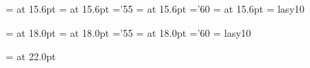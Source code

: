  \font\svtnrm  = \textname at 15.6pt	%
 \font\svtnmi  = \mathitname at 15.6pt	%
    \skewchar\svtnmi ='55       	%
 \font\svtnsy  = \mathsyname at 15.6pt	%
    \skewchar\svtnsy ='60        	%
 \font\svtnbf  = \boldname at 15.6pt	%
 \font\svtnly  = lasy10  	%

 \font\twtyrm  = \textname at 18.0pt	%
 \font\twtymi  = \mathitname at 18.0pt	%
    \skewchar\twtymi ='55       	%
 \font\twtysy  = \mathsyname at 18.0pt	%
    \skewchar\twtysy ='60        	%
 \font\twtyly  = lasy10  	%

 \font\twfvrm  = \textname at 22.0pt	%

